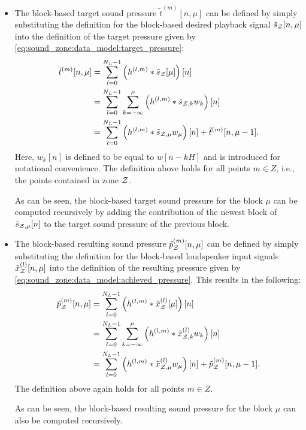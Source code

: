 \begin{itemize}
    \item 
        The block-based target sound pressure $\tilde{t}^{(m)}[n, \mu]$ can be defined by simply 
        substituting the definition for the block-based desired playback signal $\tilde{s}_{\mathcal{Z}}[n, \mu]$ into the definition of the 
        target pressure given by \autoref{eq:sound_zone:data_model:target_pressure}:
        \begin{equation}
            \begin{aligned}
                \tilde{t}^{(m)}[n, \mu] &= \sum_{l=0}^{N_L-1} \left(h^{(l,m)} \ast \tilde{s}_{\mathcal{Z}}[\mu]\right)[n]\\
                                        &= \sum_{l=0}^{N_L - 1}\sum_{k=-\infty}^{\mu}\left(h^{(l,m)}\ast\tilde{s}_{\mathcal{Z},k}w_k\right)[n] \\
                                   &= \sum_{l=0}^{N_L-1}\left(h^{(l,m)}\ast\tilde{s}_{\mathcal{Z},\mu}w_\mu\right)[n] + \tilde{t}^{(m)}[n, \mu - 1].  
            \end{aligned}
        \end{equation}
        Here, $w_k[n]$ is defined to be equal to $w[n - kH]$ and is introduced for notational convenience.  
        The definition above holds for all points $m\in Z$, i.e., the points contained in zone $\mathcal{Z}$.  

        As can be seen, the block-based target sound pressure for the block $\mu$ can be computed recursively by adding the contribution of the newest block of $\tilde{s}_{\mathcal{Z},\mu}[n]$ to the target sound pressure of the previous block.
    \item 
        The block-based resulting sound pressure $\tilde{p}_{\mathcal{Z}}^{(m)}[n, \mu]$ can be defined by simply substituting the definition for the block-based loudspeaker input signals $\tilde{x}_{\mathcal{Z}}^{(l)}[n, \mu]$ into the definition of the resulting pressure given by \autoref{eq:sound_zone:data_model:achieved_pressure}.
        This results in the following: 
        \begin{equation}
            \begin{aligned}
                \tilde{p}_{\mathcal{Z}}^{(m)}[n, \mu] &= \sum_{l=0}^{N_L-1}                       \left(h^{(l,m)} \ast \tilde{x}^{(l)}_{\mathcal{Z}}[\mu]\right)[n]\\
                                            &= \sum_{l=0}^{N_L-1}\sum_{k=-\infty}^{\mu} \left(h^{(l,m)} \ast \tilde{x}^{(l)}_{\mathcal{Z},k}w_k\right)[n] \\
                                            &= \sum_{l=0}^{N_L-1}                       \left(h^{(l,m)} \ast \tilde{x}^{(l)}_{\mathcal{Z},\mu}w_\mu\right)[n] +
                                                \tilde{p}_{\mathcal{Z}}^{(m)}[n, \mu - 1].
            \end{aligned}
            \label{eq:perceptual_sound_zones:stft:block_based:achieved_pressure}
        \end{equation}
        The definition above again holds for all points $m\in Z$.  

        As can be seen, the block-based resulting sound pressure for the block $\mu$ can also be computed recursively.
\end{itemize}

